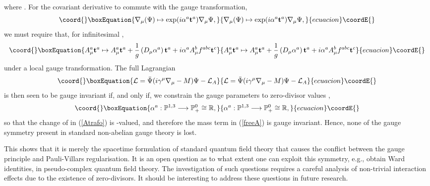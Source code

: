\documentclass[a4paper,aps,prd,showkeys,showpacs,superscriptaddress,preprint]{revtex4}
\providecommand{\pc}{\mathbb{P}}
\providecommand{\reals}{\mathbb{R}}
\begin{document}
where \coordHE{}.
For the covariant derivative to commute with the gauge transformation,
\begin{equation}\coord{}\boxEquation{
  \nabla_\mu(\Psi) \mapsto \exp(i \mathbf{\alpha}^a \mathbf{t}^a) \nabla_\mu \Psi, 
}{
  \nabla_\mu(\Psi) \mapsto \exp(i \mathbf{\alpha}^a \mathbf{t}^a) \nabla_\mu \Psi, 
}{ecuacion}\coordE{}\end{equation} 
we must require that, for infinitesimal \coordHE{}, 
\begin{equation}\coord{}\boxEquation{\label{Atrafo}
  A^a_\mu \mathbf{t}^a \mapsto A^a_\mu \mathbf{t}^a + \frac{1}{g}
  \left(D_\mu \mathbf{\alpha}^a\right) \mathbf{t}^a + i \alpha^a A^b_\mu
  f^{abc} \mathbf{t}^c 
}{A^a_\mu \mathbf{t}^a \mapsto A^a_\mu \mathbf{t}^a + \frac{1}{g}
  \left(D_\mu \mathbf{\alpha}^a\right) \mathbf{t}^a + i \alpha^a A^b_\mu
  f^{abc} \mathbf{t}^c 
}{ecuacion}\coordE{}\end{equation}
under a local gauge transformation. The full Lagrangian
\begin{equation}\coord{}\boxEquation{
  \mathcal{L} = \bar\Psi(i \gamma^\mu \nabla_\mu - M) \Psi - \mathcal{L}_A 
}{
  \mathcal{L} = \bar\Psi(i \gamma^\mu \nabla_\mu - M) \Psi - \mathcal{L}_A 
}{ecuacion}\coordE{}\end{equation}
is then seen to be gauge invariant if, and only if, we constrain the gauge
parameters to zero-divisor values \myHighlight{$\pc^0_+$}\coordHE{},
\begin{equation}\coord{}\boxEquation{
  \alpha^a: \pc^{1,3} \longrightarrow \pc^0_+ \cong \reals,
}{
  \alpha^a: \pc^{1,3} \longrightarrow \pc^0_+ \cong \reals,
}{ecuacion}\coordE{}\end{equation} 
so that the change of \coordHE{} in (\ref{Atrafo}) is \myHighlight{$\pc^0_+$}\coordHE{}-valued, and therefore the mass term in (\ref{freeA}) is gauge
invariant. Hence, none of the gauge symmetry present in standard
non-abelian gauge theory is lost. 

This shows that it is merely the spacetime formulation of standard
quantum field theory that causes the conflict between the gauge
principle and Pauli-Villars regularisation.
It is an open question as to what extent one can exploit
this symmetry, e.g., obtain Ward identities, in pseudo-complex quantum
field theory. The investigation of such questions requires a careful
analysis of non-trivial interaction effects due to the existence of
zero-divisors. It should be interesting to address these questions in
future research. 
\end{document}
